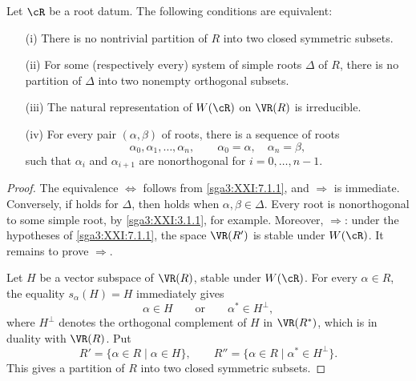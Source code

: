 \begin{proposition}\label{sga3:XXI:7.1.3}
Let \(\cR\) be a root datum. The following conditions are
equivalent:
\begin{enumerate}
\item[\SGAInlineRefTarget{sga3:XXI:7.1.3:item:i}(i)] There is no nontrivial partition of \(R\) into two
  closed symmetric subsets.
\item[\SGAInlineRefTarget{sga3:XXI:7.1:item:ii}(ii)] For some (respectively every) system of simple roots
  \(\Delta\) of \(R\), there is no partition of \(\Delta\) into
  two nonempty orthogonal subsets.
\item[\SGAInlineRefTarget{sga3:XXI:7.1.3:item:iii}(iii)] The natural representation of \(W(\cR)\) on
  \(\VR(R)\) is irreducible.
\item[\SGAInlineRefTarget{sga3:XXI:7.1.3:item:iv}(iv)] For every pair \((\alpha,\beta)\) of roots, there is a
  sequence of roots
  \[
   \alpha_0,\alpha_1,\ldots,\alpha_n,
   \qquad
   \alpha_0=\alpha,\quad\alpha_n=\beta,
  \]
  such that \(\alpha_i\) and \(\alpha_{i+1}\) are nonorthogonal
  for \(i=0,\ldots,n-1\).
\end{enumerate}
\end{proposition}

\begin{proof}
The equivalence \(\Leftrightarrow\) follows from
\ref{sga3:XXI:7.1.1}, and \(\Rightarrow\) is immediate.
Conversely, if  holds for \(\Delta\), then  holds when
\(\alpha,\beta\in\Delta\). Every root is nonorthogonal to some
simple root, by \ref{sga3:XXI:3.1.1}, for example. Moreover,
\(\Rightarrow\): under the hypotheses of
\ref{sga3:XXI:7.1.1}, the space \(\VR(R')\) is stable under
\(W(\cR)\). It remains to prove \(\Rightarrow\).

Let \(H\) be a vector subspace of \(\VR(R)\), stable under
\(W(\cR)\). For every \(\alpha\in R\), the equality
\(s_\alpha(H)=H\) immediately gives
\[
 \alpha\in H
 \qquad\text{or}\qquad
 \alpha^\ast\in H^\perp,
\]
where \(H^\perp\) denotes the orthogonal complement of \(H\) in
\(\VR(R^\ast)\), which is in duality with \(\VR(R)\). Put
\[
 R'=\{\alpha\in R\mid\alpha\in H\},
 \qquad
 R''=\{\alpha\in R\mid\alpha^\ast\in H^\perp\}.
\]
This gives a partition of \(R\) into two closed symmetric subsets.
\end{proof}

